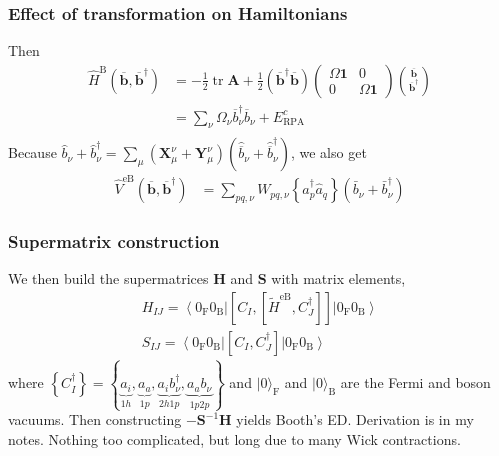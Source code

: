 \begin{frame}
    \frametitle{Effect of transformation on Hamiltonians}
Then
\begin{align}
    \hat{H}^{\mathrm{B}}\left(\overline{\mathbf{b}},
\overline{\mathbf{b}}^{\dagger}\right)&=-\frac{1}{2} \operatorname{tr} \mathbf{A}+\frac{1}{2}\left(\overline{\mathbf{b}}^{\dagger} \overline{\mathbf{b}}\right)\left(\begin{array}{cc}\Omega \mathbf{1} & 0 \\
0 & \Omega \mathbf{1}
\end{array}\right)\binom{\overline{\mathbf{b}}}{\overline{\mathbf{b}}^{\dagger}} \\
&=\sum_{\nu} \Omega_\nu \overline{b}_\nu^{\dagger} \overline{b}_\nu + E_{\mathrm{RPA}}^c \\
\end{align}
Because $\hat{b}_\nu + \hat{b}_{\nu}^\dagger = \sum_\mu \left(\mathbf{X}_{\mu}^{\nu} + \mathbf{Y}_{\mu}^{\nu}\right) \left(\hat{\overline{b}}_\nu + \hat{\overline{b}}_\nu^\dagger\right)$, we also get
\begin{align}
\hat{V}^{\mathrm{eB}}\left(\overline{\mathbf{b}},
\overline{\mathbf{b}}^{\dagger}\right)
&= \sum_{p q, \nu} W_{p q, \nu} \left\{ \hat{a}_p^{\dagger} \hat{a}_q \right\}\left(\bar{b}_\nu+\bar{b}_\nu^{\dagger}\right)
\end{align}
\end{frame}
\begin{frame}
    \frametitle{Supermatrix construction}
We then build the supermatrices $\mathbf{H}$ and $\mathbf{S}$ with matrix elements,
$$
\begin{gathered}
H_{I J}=\left\langle 0_{\mathrm{F}} 0_{\mathrm{B}}\right|\left[C_I,\left[\tilde{H}^{\mathrm{eB}}, C_J^{\dagger}\right]\right]\left|0_{\mathrm{F}} 0_{\mathrm{B}}\right\rangle \\
S_{I J}=\left\langle 0_{\mathrm{F}} 0_{\mathrm{B}}\right|\left[C_I, C_J^{\dagger}\right]\left|0_{\mathrm{F}} 0_{\mathrm{B}}\right\rangle
\end{gathered}
$$
where $\left\{C_I^{\dagger}\right\}=\left\{\underbrace{a_i}_{1h}, \underbrace{a_a}_{1p}, \underbrace{a_i b_\nu^{\dagger}}_{2h1p}, \underbrace{a_a b_\nu}_{1p2p}\right\}$ and $|0\rangle_{\mathrm{F}}$ and $|0\rangle_{\mathrm{B}}$ are the Fermi and boson vacuums. Then constructing $-\bm{S}^{-1}\bm{H}$ yields Booth's ED. Derivation is in my notes. Nothing too complicated, but long due to many Wick contractions.
\end{frame}

